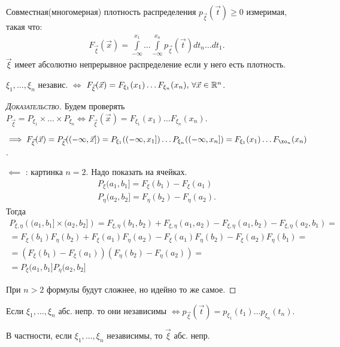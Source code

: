\begin{df}
 Совместная(многомерная) плотность распределения $ p_{\vec\xi}(\vec t) \geqslant 0 $  измеримая, такая что:
 \begin{align*}
  F_{\vec\xi}(\vec x) = \int\limits_{-\infty}^{x_1}  \ldots \int\limits_{-\infty}^{x_n} p_{\vec\xi}(\vec t) dt_n \ldots dt_1.
 \end{align*} 
 $\vec \xi$ имеет абсолютно непрерывное распределение если у него есть плотность.
\end{df}
\begin{crly}
	$ \xi_1, \ldots, \xi_n $ независ. $ \iff $ $ F_{\vec\xi}(\vec x) = F_{\xi_1}(x_1) \ldots F_{\xi_n}(x_n), \, \forall \vec x \in \mathbb{R}^n $.
\end{crly}
\begin{proof}[\normalfont\textsc{Доказательство}]
 Будем проверять $ P_{\vec\xi} = P_{\xi_1} \times \ldots \times P_{\xi_n} \iff F_{\vec\xi}(\vec x) = F_{\xi_1}(x_1) \ldots F_{\xi_n}(x_n) $.

 $ \implies F_{\vec \xi}(\vec x) = P_{\vec \xi}((-\infty, \vec x]) = P_{\xi_1}((-\infty, x_1]) \dots P_{\xi_n}((-\infty, x_n]) = F_{\xi_1}(x_1) \dots F_{\xo_n}(x_n)$.

 $ \impliedby $ : картинка $ n=2 $. Надо показать на ячейках. 
 \begin{align*}
  P_{\xi} (a_1,b_1] = F_{\xi}(b_1) - F_{\xi}(a_1) \\
  P_{\eta} (a_2,b_2] = F_{\eta}(b_2) - F_{\eta}(a_2).
 \end{align*} Тогда
 \begin{align*}
	 P_{\xi, \eta} \left( (a_1, b_1] \times (a_2, b_2] \right) 
	 = F_{\xi, \eta} (b_1, b_2) + F_{\xi, \eta} (a_1, a_2) - F_{\xi, \eta} (a_1, b_2) - F_{\xi, \eta}(a_2, b_1) = \\ 
	 = F_{\xi} (b_1) F_{\eta} (b_2) + F_{\xi}(a_1) F_{\eta} (a_2) - F_{\xi}(a_1) F_{\eta} (b_2) - F_{\xi} (a_2) F_{\eta} (b_1) = \\
	 = \left(F_{\xi} (b_1) - F_{\xi} (a_1) \right) \left( F_{\eta} (b_2) - F_{\eta} (a_2) \right) = \\
	 = P_\xi (a_1, b_1] P_\eta (a_2, b_2]
 \end{align*}

 При $n > 2$ формулы будут сложнее, но идейно то же самое.

\end{proof}
\begin{crly}
 Если $ \xi_1, \ldots, \xi_n $ абс. непр. то они независимы $ \iff p_{\vec\xi}(\vec t) = p_{\xi_1}(t_1) \ldots p_{\xi_n}(t_n) $.

 В частности, если $ \xi_1, \ldots, \xi_n $ независимы, то $ \vec\xi $ абс. непр.
\end{crly}
